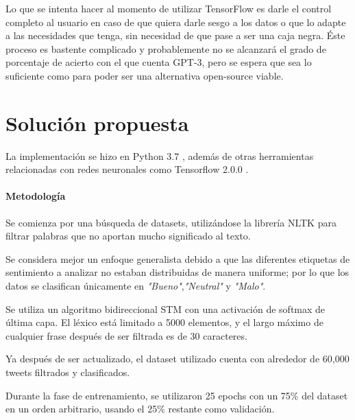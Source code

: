 \documentclass[a4]{sciposter}
\begin{document}
\begin{multicols}{2}
Lo que se intenta hacer al momento de utilizar TensorFlow es darle el control completo al usuario en caso de que quiera darle sesgo a los datos o que lo adapte a las necesidades que tenga, sin necesidad de que pase a ser una caja negra. Éste proceso es bastente complicado y probablemente no se alcanzará el grado de porcentaje de acierto con el que cuenta GPT-3, pero se espera que sea lo suficiente como para poder ser una alternativa open-source viable.



\section{Solución propuesta}
La implementación se hizo en Python 3.7 \citep{python}, además de otras herramientas relacionadas con redes neuronales como Tensorflow 2.0.0 \citep{tensorflow}.


\paragraph{Metodología}
Se comienza por una búsqueda de datasets, utilizándose la librería NLTK \citep{nltk} para filtrar palabras que no aportan mucho significado al texto.

Se considera mejor un enfoque generalista debido a que las diferentes etiquetas de sentimiento a analizar no estaban distribuidas de manera uniforme; por lo que los datos se clasifican únicamente en \textit{"Bueno"},\textit{"Neutral"} y \textit{"Malo"}.

Se utiliza un algoritmo bidireccional STM con una activación de softmax de última capa. El léxico está limitado a 5000 elementos, y el largo máximo de cualquier frase después de ser filtrada es de 30 caracteres.

Ya después de ser actualizado, el dataset utilizado cuenta con alrededor de 60,000 tweets filtrados y clasificados.

Durante la fase de entrenamiento, se utilizaron 25 epochs con un 75\% del dataset en un orden arbitrario, usando el 25\% restante como validación.


\end{multicols}
\end{document}

